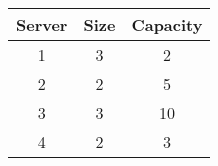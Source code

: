 \begin{tabular}{ccc}
  \toprule Server & Size &
  Capacity                    \\ \midrule
  1               & 3    & 2  \\
  2               & 2    & 5  \\
  3               & 3    & 10 \\
  4               & 2    & 3  \\
  \bottomrule
\end{tabular}